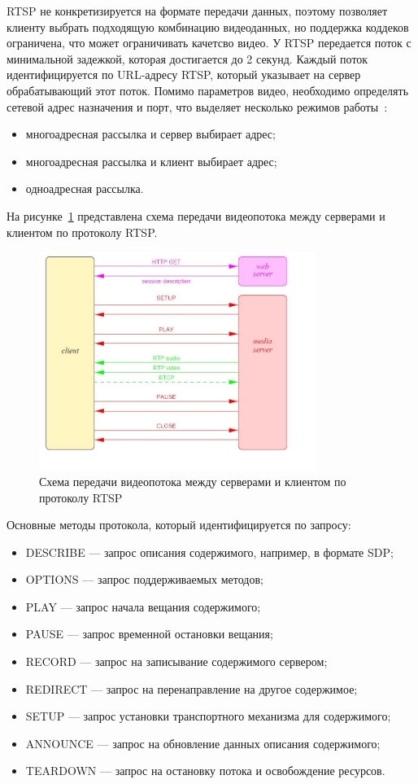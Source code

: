 RTSP не конкретизируется на формате передачи данных, поэтому позволяет клиенту выбрать подходящую комбинацию видеоданных, но поддержка коддеков ограничена, что может ограничивать качетсво видео. У RTSP передается поток с минимальной задежкой, которая достигается до 2 секунд.
Каждый поток идентифицируется по URL-адресу RTSP, который указывает на сервер обрабатывающий этот поток.
Помимо параметров видео, необходимо определять сетевой адрес назначения и порт, что выделяет несколько режимов работы~\cite{rfc_rtsp}:
\begin{itemize}
	\item многоадресная рассылка и сервер выбирает адрес;
	\item многоадресная рассылка и клиент выбирает адрес;
	\item одноадресная рассылка.
\end{itemize}

На рисунке~\ref{pr:rtsp} представлена схема передачи видеопотока между серверами и клиентом по протоколу RTSP.

\begin{figure}[h]
	\centering
	\includegraphics[width=0.8\textwidth]{img/rtsp.jpeg}
	\caption{Схема передачи видеопотока между серверами и клиентом по протоколу RTSP}
	\label{pr:rtsp}
\end{figure}

\clearpage

Основные методы протокола, который идентифицируется по запросу:
\begin{itemize}
	\item DESCRIBE --- запрос описания содержимого, например, в формате SDP;
	\item OPTIONS --- запрос поддерживаемых методов;
	\item PLAY --- запрос начала вещания содержимого;
	\item PAUSE --- запрос временной остановки вещания;
	\item RECORD --- запрос на записывание содержимого сервером;
	\item REDIRECT --- запрос на перенаправление на другое содержимое;
	\item SETUP --- запрос установки транспортного механизма для содержимого;
	\item ANNOUNCE --- запрос на обновление данных описания содержимого;
	\item TEARDOWN --- запрос на остановку потока и освобождение ресурсов.
\end{itemize}

